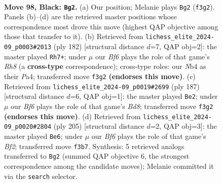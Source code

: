 \documentclass[11pt]{article}
\begin{document}
\clearpage

\begin{figure}[p]\centering
\begin{subfigure}{0.46\textwidth}\centering
\resizebox{\linewidth}{!}{%
\newchessgame
\chessboard[
  setfen={8/7k/8/8/1n1B3K/5b2/5P2/8 b - - 42 98},
  showmover=false,
  pgfstyle=straightmove, color=movearrow, markmove={f3-g2}
]}
\caption{}
\end{subfigure}\hfill
\begin{subfigure}{0.46\textwidth}\centering
\resizebox{\linewidth}{!}{%
\newchessgame
\chessboard[
  setfen={7R/2k5/8/p2K4/P7/8/3b4/8 w - - 46 92},
  showmover=false,
  pgfstyle=straightmove, color=movearrow, markmove={h8-h7}
]}
\caption{}
\end{subfigure}
\\[4pt]
\begin{subfigure}{0.46\textwidth}\centering
\resizebox{\linewidth}{!}{%
\newchessgame
\chessboard[
  setfen={6B1/8/8/8/3k4/P7/1K6/3b4 b - - 10 94},
  showmover=false,
  pgfstyle=straightmove, color=movearrow, markmove={d1-e2}
]}
\caption{}
\end{subfigure}\hfill
\begin{subfigure}{0.46\textwidth}\centering
\resizebox{\linewidth}{!}{%
\newchessgame
\chessboard[
  setfen={8/5b2/5P2/8/3B4/8/3k4/1K6 b - - 20 103},
  showmover=false,
  pgfstyle=straightmove, color=movearrow, markmove={f7-e6}
]}
\caption{}
\end{subfigure}
\caption{\textbf{Move 98, Black: \texttt{Bg2}.} (a) Our position; Melanie plays \texttt{Bg2} (\texttt{f3g2}). Panels (b)--(d) are the retrieved master positions whose correspondence most drove this move (highest QAP objective among those that transfer to it). (b) Retrieved from \texttt{lichess\_elite\_2024-09\_p0003\#2013} (ply 182) [structural distance $d$=7, QAP obj=2]: the master played \texttt{Rh7+}; under $\mu$ our \emph{Bf6} plays the role of that game's \emph{Rh8} (a \textbf{cross-type} correspondence); cross-type roles: our \emph{N}b4 as their \emph{P}a4; transferred move \texttt{f3g2} \textbf{(endorses this move)}. (c) Retrieved from \texttt{lichess\_elite\_2024-09\_p0019\#2699} (ply 187) [structural distance $d$=6, QAP obj=1]: the master played \texttt{Be2}; under $\mu$ our \emph{Bf6} plays the role of that game's \emph{Bd8}; transferred move \texttt{f3g2} \textbf{(endorses this move)}. (d) Retrieved from \texttt{lichess\_elite\_2024-09\_p0020\#2804} (ply 205) [structural distance $d$=2, QAP obj=3]: the master played \texttt{Be6}; under $\mu$ our \emph{Bf6} plays the role of that game's \emph{Bf2}; transferred move \texttt{f3b7}. Synthesis: 5 retrieved analogs transferred to \texttt{Bg2} (summed QAP objective 6, the strongest correspondence among the candidate moves); Melanie committed it via the \texttt{search} selector.}
\label{fig:thought-m195}
\end{figure}
\end{document}
